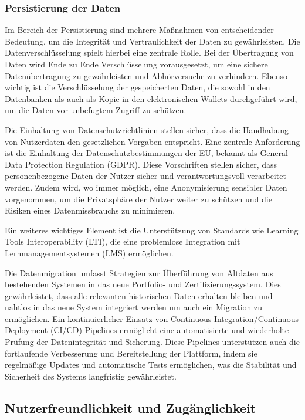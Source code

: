 \documentclass[conference]{IEEEtran}
\begin{document}
\subsubsection{Persistierung der Daten}

Im Bereich der Persistierung sind mehrere Maßnahmen von entscheidender Bedeutung, um die Integrität und Vertraulichkeit der Daten zu gewährleisten. Die Datenverschlüsselung spielt hierbei eine zentrale Rolle. Bei der Übertragung von Daten wird Ende zu Ende Verschlüsselung vorausgesetzt, um eine sichere Datenübertragung zu gewährleisten und Abhörversuche zu verhindern. Ebenso wichtig ist die Verschlüsselung der gespeicherten Daten, die sowohl in den Datenbanken als auch als Kopie in den elektronischen Wallets durchgeführt wird, um die Daten vor unbefugtem Zugriff zu schützen.

Die Einhaltung von Datenschutzrichtlinien stellen sicher, dass die Handhabung von Nutzerdaten den gesetzlichen Vorgaben entspricht. Eine zentrale Anforderung ist die Einhaltung der Datenschutzbestimmungen der EU, bekannt als General Data Protection Regulation (GDPR). Diese Vorschriften stellen sicher, dass personenbezogene Daten der Nutzer sicher und verantwortungsvoll verarbeitet werden. Zudem wird, wo immer möglich, eine Anonymisierung sensibler Daten vorgenommen, um die Privatsphäre der Nutzer weiter zu schützen und die Risiken eines Datenmissbrauchs zu minimieren.

Ein weiteres wichtiges Element ist die Unterstützung von Standards wie Learning Tools Interoperability (LTI), die eine problemlose Integration mit Lernmanagementsystemen (LMS) ermöglichen.

Die Datenmigration umfasst Strategien zur Überführung von Altdaten aus bestehenden Systemen in das neue Portfolio- und Zertifizierungssystem. Dies gewährleistet, dass alle relevanten historischen Daten erhalten bleiben und nahtlos in das neue System integriert werden um auch ein Migration zu ermöglichen. Ein kontinuierlicher Einsatz von Continuous Integration/Continuous Deployment (CI/CD) Pipelines ermöglicht eine automatisierte und wiederholte Prüfung der Datenintegrität und Sicherung. Diese Pipelines unterstützen auch die fortlaufende Verbesserung und Bereitstellung der Plattform, indem sie regelmäßige Updates und automatische Tests ermöglichen, was die Stabilität und Sicherheit des Systems langfristig gewährleistet.

\subsection{Nutzerfreundlichkeit und Zugänglichkeit}
\end{document}
